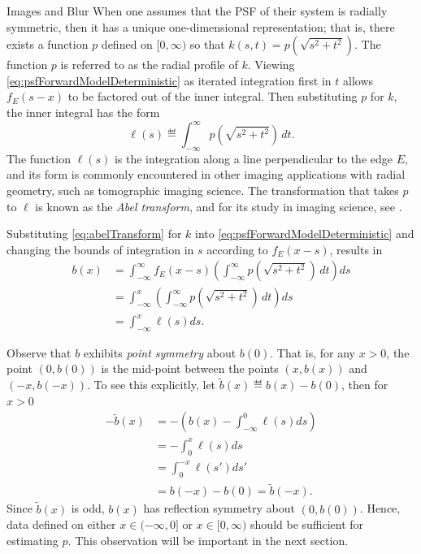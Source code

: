 \begin{chapter}{Images and Blur}
  When one assumes that the PSF of their system is radially symmetric, then it has a unique one-dimensional representation; that is, there exists a function $p$ defined on $[0,\infty)$ so that $k(s,t) = p\left(\sqrt{s^2 + t^2}\right)$.  
  The function $p$ is referred to as the radial profile of $k$.
  Viewing \eqref{eq:psfForwardModelDeterministic} as iterated integration first in $t$ allows $f_E(s-x)$ to be factored out of the inner integral. 
  Then substituting $p$ for $k$, the inner integral has the form
  \begin{equation} \label{eq:abelTransform}
    \ell(s) \eqdef \int_{-\infty}^\infty p\left(\sqrt{s^2 + t^2}\right)\,dt.
  \end{equation}
  The function $\ell(s)$ is the integration along a line perpendicular to the edge $E$, and its form is commonly encountered in other imaging applications with radial geometry, such as tomographic imaging science.
  The transformation that takes $p$ to $\ell$ is known as the \emph{Abel transform}, and for its study in imaging science, see \citep{bracewell,epstein2008,knill93}.

  Substituting \eqref{eq:abelTransform} for $k$ into  \eqref{eq:psfForwardModelDeterministic} and changing the bounds of integration in $s$ according to $f_E(x-s)$, results in
  \begin{align}
    b(x) &= \int_{-\infty}^\infty f_E(x-s) \left(\int_{-\infty}^\infty p\left(\sqrt{s^2 + t^2}\right)\,dt\right)ds \nonumber \\
         &= \int_{-\infty}^x \left(\int_{-\infty}^\infty p\left(\sqrt{s^2 + t^2}\right)\,dt\right)ds \nonumber \\
         &= \int_{-\infty}^x \ell(s)ds. \label{eq:abelForward}
  \end{align}

  Observe that $b$ exhibits \emph{point symmetry} about $b(0)$.
  That is, for any $x>0$, the point $(0,b(0))$ is the mid-point between the points $(x,b(x))$ and $(-x,b(-x))$. 
  To see this explicitly, let $\tilde b(x) \eqdef b(x) - b(0)$, then for $x>0$
  \begin{align}
    -\tilde b(x) &= -\left(b(x) - \int_{-\infty}^0 \ell(s)ds\right) \nonumber \\
      &= -\int_0^x \ell(s)ds \nonumber \\
      &= \int_0^{-x}\ell(s')ds'  \nonumber \\
      &= b(-x) - b(0) = \tilde b(-x).
  \end{align}
  Since $\tilde b(x)$ is odd, $b(x)$ has reflection symmetry about $(0,b(0))$.
  Hence, data defined on either $x\in(-\infty,0]$ or $x\in[0,\infty)$ should be sufficient for estimating $p$.
  This observation will be important in the next section.


\end{chapter}
